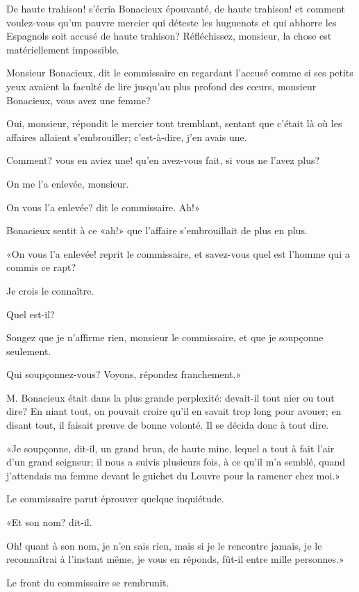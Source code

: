 \speak  De haute trahison! s'écria Bonacieux épouvanté, de haute trahison! et comment voulez-vous qu'un pauvre mercier qui déteste les huguenots et qui abhorre les Espagnols soit accusé de haute trahison? Réfléchissez, monsieur, la chose est matériellement impossible. 

\speak  Monsieur Bonacieux, dit le commissaire en regardant l'accusé comme si ses petits yeux avaient la faculté de lire jusqu'au plus profond des cœurs, monsieur Bonacieux, vous avez une femme? 

\speak  Oui, monsieur, répondit le mercier tout tremblant, sentant que c'était là où les affaires allaient s'embrouiller; c'est-à-dire, j'en avais une. 

\speak  Comment? vous en aviez une! qu'en avez-vous fait, si vous ne l'avez plus? 

\speak  On me l'a enlevée, monsieur. 

\speak  On vous l'a enlevée? dit le commissaire. Ah!» 

Bonacieux sentit à ce «ah!» que l'affaire s'embrouillait de plus en plus. 

«On vous l'a enlevée! reprit le commissaire, et savez-vous quel est l'homme qui a commis ce rapt? 

\speak  Je crois le connaître. 

\speak  Quel est-il? 

\speak  Songez que je n'affirme rien, monsieur le commissaire, et que je soupçonne seulement. 

\speak  Qui soupçonnez-vous? Voyons, répondez franchement.» 

M. Bonacieux était dans la plus grande perplexité: devait-il tout nier ou tout dire? En niant tout, on pouvait croire qu'il en savait trop long pour avouer; en disant tout, il faisait preuve de bonne volonté. Il se décida donc à tout dire. 

«Je soupçonne, dit-il, un grand brun, de haute mine, lequel a tout à fait l'air d'un grand seigneur; il nous a suivis plusieurs fois, à ce qu'il m'a semblé, quand j'attendais ma femme devant le guichet du Louvre pour la ramener chez moi.» 

Le commissaire parut éprouver quelque inquiétude. 

«Et son nom? dit-il. 

\speak  Oh! quant à son nom, je n'en sais rien, mais si je le rencontre jamais, je le reconnaîtrai à l'instant même, je vous en réponds, fût-il entre mille personnes.» 

Le front du commissaire se rembrunit. 


